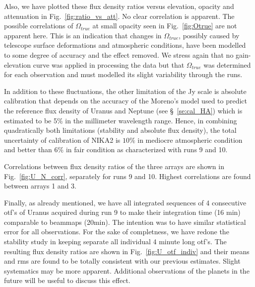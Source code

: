 Also, we have plotted these flux density ratios versus elevation, opacity and attenuation in  Fig.~\ref{fig:ratio_vs_att}.
No clear correlation is apparent. The possible correlations of $\Omega_{true}$ at small opacity seen in Fig.~\ref{fig:Otrue}
are not apparent here. This is an indication that changes in $\Omega_{true}$, possibly 
caused by telescope surface deformations and atmospheric conditions, have been modelled
to some degree of accuracy and  the effect removed. We stress again that no gain-elevation curve was applied
in processing the data but that  $\Omega_{true}$ was determined for each observation and must modelled its slight variability
through the runs.

In addition to these fluctuations, the other limitation of the Jy scale is absolute calibration that depends on the
accuracy of the Moreno's model used to  predict the reference flux density of Uranus and Neptune (see \S~\ref{se:cal_HA})    
which is estimated to be 5\% in the millimeter wavelength range.
Hence, in combining quadratically both limitations (stability and absolute flux density),
the total uncertainty of calibration of NIKA2 is $10\%$ in mediocre atmospheric
condition and better than $6\%$ in fair condition as characterized with runs 9 and 10.

Correlations between flux density ratios of the three arrays are shown in Fig.~\ref{fig:U_N_corr}, separately
for runs 9 and  10. Highest correlations are found between arrays 1 and 3.

Finally, as already mentioned, we have all integrated sequences of 4 consecutive otf's of Uranus
acquired during run 9 to make their integration time (16 min) comparable to beammaps (20min). The intention was
to have similar  statistical error for all observations.  For the sake of completness, we have redone the stability study
in keeping separate all individual 4 minute long otf's.
The resulting flux density ratios are shown in Fig.~\ref{fig:U_otf_indiv}
and their means and rms are found to be totally consistent with our previous estimates.
Slight systematics may be more apparent. Additional observations of the planets in the
future will be useful to discuss this effect.


